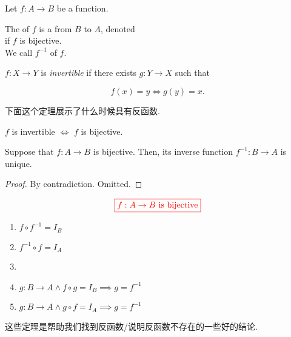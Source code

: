 \begin{definition}
  Let $f: A \to B$ be a function. 

  The  of $f$ is a 
  from $B$ to $A$, denoted  \\
  if $f$ is bijective. \\

  We call $f^{-1}$   of $f$.
\end{definition}


\begin{definition}[Invertible]
      $f: X \to Y$ is {\it invertible} if there exists $g: Y \to X$ such that
  
      \[
        f(x) = y \iff g(y) = x.
      \]
\end{definition}

下面这个定理展示了什么时候具有反函数. 
\begin{theorem}
  $f$ is invertible $\iff$ $f$ is bijective.
\end{theorem}

\begin{theorem}
  Suppose that $f: A \to B$ is bijective.
  Then, its inverse function $f^{-1}: B \to A$ is unique.
\end{theorem}

\begin{proof}
  By contradiction. Omitted.
\end{proof}

\begin{theorem}[]
  \[
    \textcolor{red}{\boxed{f: A \to B \text{ is bijective}}}
  \]

  \begin{enumerate}
    \item $f \circ f^{-1} = I_B$
    \item $f^{-1} \circ f = I_A$
    \vspace{0.30cm}
    \item {}
    \vspace{0.30cm}
    \item $g: B \to A \land f \circ g = I_B \implies g = f^{-1}$
    \item $g: B \to A \land g \circ f = I_A \implies g = f^{-1}$
  \end{enumerate}
\end{theorem}

这些定理是帮助我们找到反函数/说明反函数不存在的一些好的结论.


